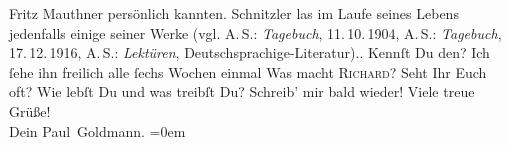 \begin{ledgroupsized}[t]{13cm}
{{{                     Fritz Mauthner persönlich kannten. Schnitzler las im Laufe seines Lebens
                  jedenfalls einige seiner Werke (vgl. A. S.: \emph{Tagebuch}, 11. 10. 1904, A. S.: \emph{Tagebuch}, 17. 12. 1916, A. S.: \emph{Lektüren}, Deutschsprachige-Literatur).}}}\label{K_L02907-7h}. Kennſt Du den? Ich ſehe ihn
               freilich alle ſechs Wochen einmal{\dotsfour}\pend
           \pstart
           Was macht \textsc{Richard}? Seht Ihr Euch oft? Wie lebſt Du und was treibſt Du?\pend
           \pstart
           Schreib’ mir bald wieder!\pend
           \pstart
           Viele treue Grüße! {\\[\baselineskip]}Dein \spacefill\mbox{Paul Goldmann.}\pend
           \leftskip=0em{}
         
         \endnumbering{}\end{ledgroupsized}\begin{anhang}\end{anhang}\newcommand{\dateiname}{L02907}\newcommand{\titel}{Paul Goldmann an Arthur Schnitzler, 22. 3. [1900]}\newcommand{\editorInnen}{Martin Anton Müller und Laura Untner}
      